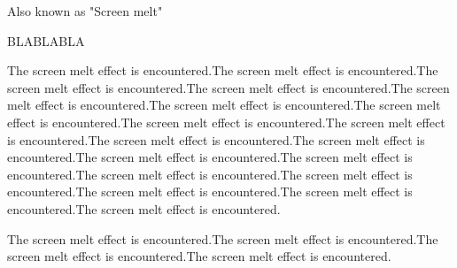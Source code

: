Also known as "Screen melt"
\label{label_melt}
\par BLABLABLA
\par
The screen melt effect is encountered.The screen melt effect is encountered.The screen melt effect is encountered.The screen melt effect is encountered.The screen melt effect is encountered.The screen melt effect is encountered.The screen melt effect is encountered.The screen melt effect is encountered.The screen melt effect is encountered.The screen melt effect is encountered.The screen melt effect is encountered.The screen melt effect is encountered.The screen melt effect is encountered.The screen melt effect is encountered.The screen melt effect is encountered.The screen melt effect is encountered.The screen melt effect is encountered.The screen melt effect is encountered.\\
\par
The screen melt effect is encountered.The screen melt effect is encountered.The screen melt effect is encountered.The screen melt effect is encountered.\\
\par
{}\\
\\
\\
\\